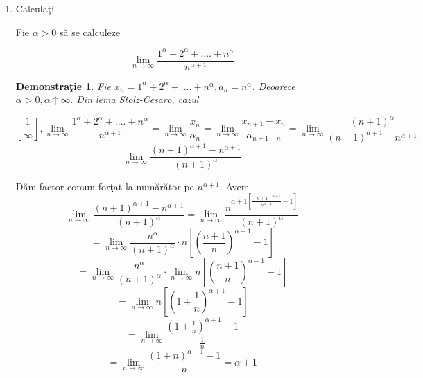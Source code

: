 \documentclass[a4paper,12pt,oneside]{report}
\newtheorem{demonstration}{Demonstra\c tie}
\begin{document}
\begin{enumerate}
\item Calcula\c ti 

 Fie \(\alpha > 0\) s\u a se calculeze 

\begin{displaymath}
  \lim_{n \to \infty }\frac{1^{\alpha }+2^{\alpha }+....+n^{\alpha }}{n^{\alpha +1}}
\end{displaymath}


\begin{demonstration}
  Fie \(x_{n}=1^{\alpha }+2^{\alpha }+....+n^{\alpha },a_{n}= n^{\alpha }\). Deoarece \(\alpha > 0 , \alpha \uparrow \infty.\) Din lema Stolz-Cesaro, cazul 
\end{demonstration}

\begin{displaymath}
  \left [ \frac{1}{\infty } \right ], 
\lim_{n \to \infty }\frac{1^{\alpha }+2^{\alpha }+....+n^{\alpha }}{n^{\alpha +1}}=\lim_{n \to \infty }\frac{x_{n}}{\alpha _{n}}= \lim_{n \to \infty } \frac{x_{n+1}-x_{n}}{\alpha _{n+1}-_{n}}=\lim_{n \to \infty } \frac{\left ( n+1 \right )^{\alpha }}{\left ( n+1 \right )^{\alpha+1} -n^{\alpha +1}}
\end{displaymath}
\begin{displaymath}
  \lim_{n \to \infty }\frac{\left ( n+1 \right )^{\alpha +1}-n^{\alpha +1}}{\left ( n+1 \right )^{\alpha }}
\end{displaymath}

D\u am factor comun for\c tat la num\u ar\u ator pe \(n^{\alpha +1}\). Avem 
\begin{displaymath}
  \lim_{n \to \infty }\frac{\left ( n+1 \right )^{\alpha +1}-n^{\alpha +1}}{\left ( n+1 \right )^{\alpha }} = \lim_{n \to \infty }\frac{n^{\alpha +1\left [ \frac{\left ( n+1 \right )^{\alpha +1}}{n^{\alpha +1}} -1\right ]}}{\left ( n+1 \right )^{\alpha }} 
\end{displaymath}
\begin{displaymath}
  = \lim_{n \to \infty }\frac{n^{\alpha }}{\left ( n+1 \right )^{\alpha }}\cdot n\left [ \left ( \frac{n+1}{n} \right )^{\alpha +1}-1 \right ]
\end{displaymath}
\begin{displaymath}
  =\lim_{n \to \infty }\frac{n^{\alpha }}{\left ( n+1 \right )^{\alpha }}\cdot \lim_{n \to \infty }n\left [ \left ( \frac{n+1}{n} \right )^{\alpha +1} -1\right ]
\end{displaymath}
\begin{displaymath}
  =\lim_{n \to \infty }n\left [ \left ( 1+\frac{1}{n} \right )^{\alpha +1}-1 \right ]
\end{displaymath}
\begin{displaymath}
  = \lim_{n \to \infty }\frac{\left ( 1+\frac{1}{n} \right )^{\alpha +1}-1}{\frac{1}{n}}
\end{displaymath}
\begin{displaymath}
  =\lim_{n \to \infty }\frac{\left ( 1+n \right )^{\alpha +1}-1}{n}= \alpha +1
\end{displaymath}


\end{enumerate}
\end{document}
